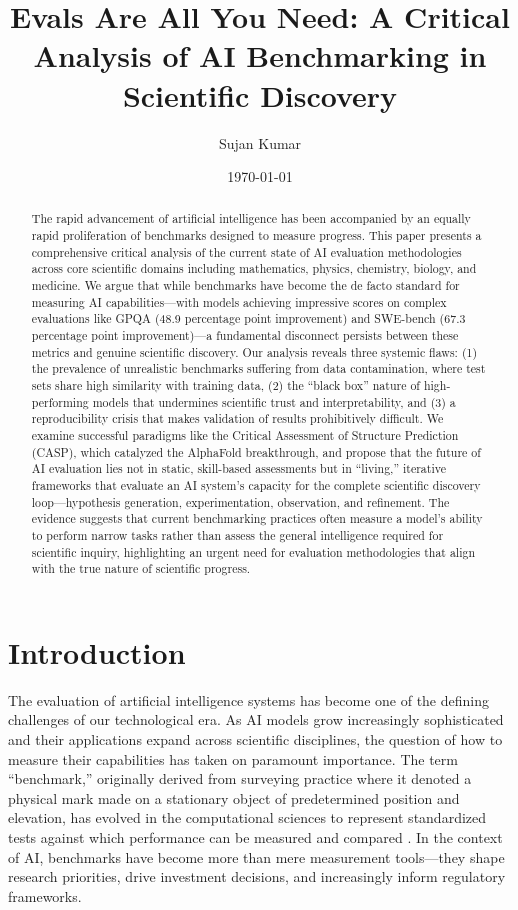 \documentclass[10pt,twocolumn]{article}
\title{\Large \textbf{Evals Are All You Need: A Critical Analysis of AI Benchmarking in Scientific Discovery}}
\author[1]{Sujan Kumar}
\affil[1]{HCLTech AI}
\date{\today}
\begin{document}
\maketitle

\begin{abstract}
The rapid advancement of artificial intelligence has been accompanied by an equally rapid proliferation of benchmarks designed to measure progress. This paper presents a comprehensive critical analysis of the current state of AI evaluation methodologies across core scientific domains including mathematics, physics, chemistry, biology, and medicine. We argue that while benchmarks have become the de facto standard for measuring AI capabilities—with models achieving impressive scores on complex evaluations like GPQA (48.9 percentage point improvement) and SWE-bench (67.3 percentage point improvement)—a fundamental disconnect persists between these metrics and genuine scientific discovery. Our analysis reveals three systemic flaws: (1) the prevalence of unrealistic benchmarks suffering from data contamination, where test sets share high similarity with training data, (2) the ``black box'' nature of high-performing models that undermines scientific trust and interpretability, and (3) a reproducibility crisis that makes validation of results prohibitively difficult. We examine successful paradigms like the Critical Assessment of Structure Prediction (CASP), which catalyzed the AlphaFold breakthrough, and propose that the future of AI evaluation lies not in static, skill-based assessments but in ``living,'' iterative frameworks that evaluate an AI system's capacity for the complete scientific discovery loop—hypothesis generation, experimentation, observation, and refinement. The evidence suggests that current benchmarking practices often measure a model's ability to perform narrow tasks rather than assess the general intelligence required for scientific inquiry, highlighting an urgent need for evaluation methodologies that align with the true nature of scientific progress.
\end{abstract}

\section{Introduction}

The evaluation of artificial intelligence systems has become one of the defining challenges of our technological era. As AI models grow increasingly sophisticated and their applications expand across scientific disciplines, the question of how to measure their capabilities has taken on paramount importance. The term ``benchmark,'' originally derived from surveying practice where it denoted a physical mark made on a stationary object of predetermined position and elevation, has evolved in the computational sciences to represent standardized tests against which performance can be measured and compared \cite{stanford2025}. In the context of AI, benchmarks have become more than mere measurement tools—they shape research priorities, drive investment decisions, and increasingly inform regulatory frameworks.
\end{document}
